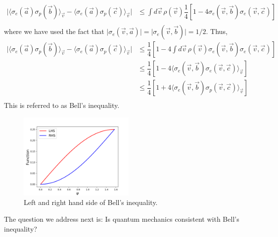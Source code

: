 \documentclass[aps,prb,onecolumn,notitlepage,showpacs,floatfix,superscriptaddress]{revtex4-1}
\begin{document}
\begin{equation}
\begin{split}
\vert \langle \sigma_e(\vec{a}) \sigma_p(\vec{b}) \rangle_{\vec{v}}-\langle \sigma_e(\vec{a}) \sigma_p(\vec{c}) \rangle_{\vec{v}} \vert  &\leq \int d\vec{v} \, \rho(\vec{v}) \dfrac{1}{4} \left[1-4\sigma_e(\vec{v},\vec{b}) \sigma_e(\vec{v},\vec{c})\right] \\
\end{split}
\end{equation}
where we have used the fact that $\vert \sigma_e(\vec{v},\vec{a}) \vert = \vert \sigma_e(\vec{v},\vec{b}) \vert = 1/2 $. Thus,
\begin{equation}
\begin{split}
\vert \langle \sigma_e(\vec{a}) \sigma_p(\vec{b}) \rangle_{\vec{v}}-\langle \sigma_e(\vec{a}) \sigma_p(\vec{c}) \rangle_{\vec{v}} \vert  &\leq \dfrac{1}{4}  \left[ 1 - 4 \int d\vec{v} \, \rho(\vec{v}) \sigma_e(\vec{v},\vec{b}) \sigma_e(\vec{v},\vec{c})\right] \\
&\leq \dfrac{1}{4}  \left[ 1 - 4 \langle \sigma_e(\vec{v},\vec{b}) \sigma_e(\vec{v},\vec{c})\rangle_{\vec{v}} \right] \\
&\leq \dfrac{1}{4}  \left[ 1 + 4 \langle \sigma_e(\vec{v},\vec{b}) \sigma_p(\vec{v},\vec{c})\rangle_{\vec{v}} \right] \\
\end{split}
\end{equation}
This is referred to as Bell's inequality. \\

\begin{figure}[hbtp]
\centering
\includegraphics[width=0.5\textwidth]{Figure_1.png}
\caption{Left and right hand side of Bell's inequality.}
\end{figure}

The question we address next is: Is quantum mechanics consistent with Bell's inequality?\\
\end{document}
